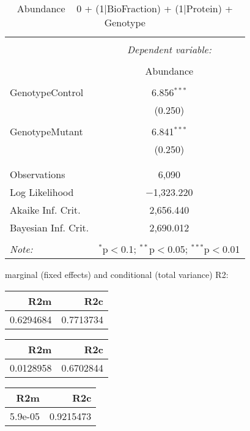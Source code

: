 \documentclass[11pt]{report}
\begin{document}
\begin{table}[!htbp] \centering 
  \caption{Abundance ~ 0 + (1|BioFraction) + (1|Protein) + Genotype} 
  \label{} 
\begin{tabular}{@{\extracolsep{5pt}}lc} 
\\[-1.8ex]\hline 
\hline \\[-1.8ex] 
 & \multicolumn{1}{c}{\textit{Dependent variable:}} \\ 
\cline{2-2} 
\\[-1.8ex] & Abundance \\ 
\hline \\[-1.8ex] 
 GenotypeControl & 6.856$^{***}$ \\ 
  & (0.250) \\ 
  & \\ 
 GenotypeMutant & 6.841$^{***}$ \\ 
  & (0.250) \\ 
  & \\ 
\hline \\[-1.8ex] 
Observations & 6,090 \\ 
Log Likelihood & $-$1,323.220 \\ 
Akaike Inf. Crit. & 2,656.440 \\ 
Bayesian Inf. Crit. & 2,690.012 \\ 
\hline 
\hline \\[-1.8ex] 
\textit{Note:}  & \multicolumn{1}{r}{$^{*}$p$<$0.1; $^{**}$p$<$0.05; $^{***}$p$<$0.01} \\ 
\end{tabular} 
\end{table} 
marginal (fixed effects) and conditional (total variance) R2:

\begin{tabular}{r|r}
\hline
R2m & R2c\\
\hline
0.6294684 & 0.7713734\\
\hline
\end{tabular}

\begin{tabular}{r|r}
\hline
R2m & R2c\\
\hline
0.0128958 & 0.6702844\\
\hline
\end{tabular}

\begin{tabular}{r|r}
\hline
R2m & R2c\\
\hline
5.9e-05 & 0.9215473\\
\hline
\end{tabular}
\end{document}
